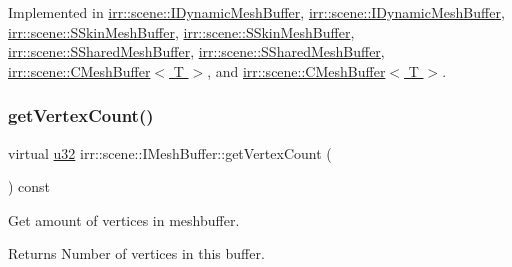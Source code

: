Implemented in \hyperlink{classirr_1_1scene_1_1IDynamicMeshBuffer_afc317a8ccda7e7eceb1f4955c90848d2}{irr\+::scene\+::\+I\+Dynamic\+Mesh\+Buffer}, \hyperlink{classirr_1_1scene_1_1IDynamicMeshBuffer_afc317a8ccda7e7eceb1f4955c90848d2}{irr\+::scene\+::\+I\+Dynamic\+Mesh\+Buffer}, \hyperlink{structirr_1_1scene_1_1SSkinMeshBuffer_a0420d14f4a4317192aa3423c0634d8d8}{irr\+::scene\+::\+S\+Skin\+Mesh\+Buffer}, \hyperlink{structirr_1_1scene_1_1SSkinMeshBuffer_a0420d14f4a4317192aa3423c0634d8d8}{irr\+::scene\+::\+S\+Skin\+Mesh\+Buffer}, \hyperlink{structirr_1_1scene_1_1SSharedMeshBuffer_aa50aed87725f3cc745b0f04f0233107b}{irr\+::scene\+::\+S\+Shared\+Mesh\+Buffer}, \hyperlink{structirr_1_1scene_1_1SSharedMeshBuffer_aa50aed87725f3cc745b0f04f0233107b}{irr\+::scene\+::\+S\+Shared\+Mesh\+Buffer}, \hyperlink{classirr_1_1scene_1_1CMeshBuffer_a72ee778498eff327a20c6be179976994}{irr\+::scene\+::\+C\+Mesh\+Buffer$<$ T $>$}, and \hyperlink{classirr_1_1scene_1_1CMeshBuffer_a72ee778498eff327a20c6be179976994}{irr\+::scene\+::\+C\+Mesh\+Buffer$<$ T $>$}.

\mbox{\label{classirr_1_1scene_1_1IMeshBuffer_a77ab285c8c886af8ddeb0371db7bde96}} 
\subsubsection{\texorpdfstring{get\+Vertex\+Count()}{getVertexCount()}\hspace{0.1cm}{\footnotesize\ttfamily [2/2]}}
{\footnotesize\ttfamily virtual \hyperlink{namespaceirr_a0416a53257075833e7002efd0a18e804}{u32} irr\+::scene\+::\+I\+Mesh\+Buffer\+::get\+Vertex\+Count (\begin{DoxyParamCaption}{ }\end{DoxyParamCaption}) const\hspace{0.3cm}{\ttfamily [pure virtual]}}



Get amount of vertices in meshbuffer. 

\begin{DoxyReturn}{Returns}
Number of vertices in this buffer. 
\end{DoxyReturn}


